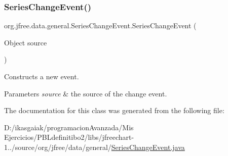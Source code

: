 \subsubsection{\texorpdfstring{Series\+Change\+Event()}{SeriesChangeEvent()}}
{\footnotesize\ttfamily org.\+jfree.\+data.\+general.\+Series\+Change\+Event.\+Series\+Change\+Event (\begin{DoxyParamCaption}\item[{Object}]{source }\end{DoxyParamCaption})}

Constructs a new event.


\begin{DoxyParams}{Parameters}
{\em source} & the source of the change event. \\
\hline
\end{DoxyParams}


The documentation for this class was generated from the following file\+:\begin{DoxyCompactItemize}
\item 
D\+:/ikasgaiak/programacion\+Avanzada/\+Mis Ejercicios/\+P\+B\+Ldefinitibo2/libs/jfreechart-\/1../source/org/jfree/data/general/\mbox{\hyperlink{_series_change_event_8java}{Series\+Change\+Event.\+java}}\end{DoxyCompactItemize}
